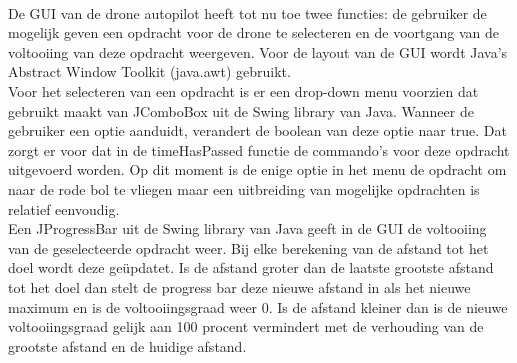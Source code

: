 \\
De GUI van de drone autopilot heeft tot nu toe twee functies: de gebruiker de mogelijk geven een opdracht voor de drone te selecteren en de voortgang van de voltooiing van deze opdracht weergeven.
Voor de layout van de GUI wordt Java's Abstract Window Toolkit (java.awt) gebruikt.\\

Voor het selecteren van een opdracht is er een drop-down menu voorzien dat gebruikt maakt van JComboBox uit de Swing library van Java. Wanneer de gebruiker een optie aanduidt, verandert de boolean van deze optie naar true. Dat zorgt er voor dat in de timeHasPassed functie de commando's voor deze opdracht uitgevoerd worden. Op dit moment is de enige optie in het menu de opdracht om naar de rode bol te vliegen maar een uitbreiding van mogelijke opdrachten is relatief eenvoudig.\\

Een JProgressBar uit de Swing library van Java geeft in de GUI de voltooiing van de geselecteerde opdracht weer. Bij elke berekening van de afstand tot het doel wordt deze ge\"{u}pdatet. Is de afstand groter dan de laatste grootste afstand tot het doel dan stelt de progress bar deze nieuwe afstand in als het nieuwe maximum en is de voltooiingsgraad weer 0. Is de afstand kleiner dan is de nieuwe voltooiingsgraad gelijk aan 100 procent vermindert met de verhouding van de grootste afstand en de huidige afstand.  
